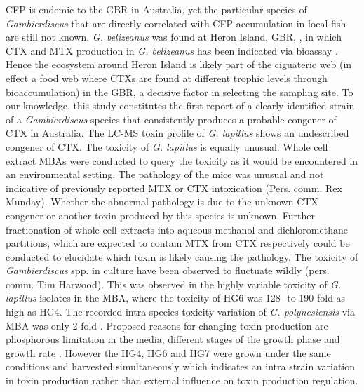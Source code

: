 \documentclass[12pt]{article}
\begin{document}
CFP is endemic to the GBR in Australia, yet the particular species of \textit{Gambierdiscus} that are directly correlated with CFP accumulation in local fish are still not known.
\emph{G. belizeanus} was found at Heron Island, GBR, \citep{murray2014molecular}, in which CTX and MTX production in \emph{G. belizeanus} has been indicated via bioassay \citep{chinain2010growth,holland2013differences}. 
Hence the ecosystem around Heron Island is likely part of the ciguateric web (in effect a food web where CTXs are found at different trophic levels through bioaccumulation) in the GBR, a decisive factor in selecting the sampling site.
To our knowledge, this study constitutes the first report of a clearly identified strain of a \textit{Gambierdiscus} species that consistently produces a probable congener of CTX in Australia. The LC-MS toxin profile of \emph{G. lapillus} shows an undescribed congener of CTX.
The toxicity of \emph{G. lapillus} is equally unusual. 
Whole cell extract MBAs were conducted to query the toxicity as it would be encountered in an environmental setting. The pathology of the mice was unusual and not indicative of previously reported MTX or CTX intoxication (Pers. comm. Rex Munday). 
Whether the abnormal pathology is due to the unknown CTX congener or another toxin produced by this species is unknown. 
Further fractionation of whole cell extracts into aqueous methanol and dichloromethane partitions, which are expected to contain MTX from CTX respectively \citep{satake1993structure} could be conducted to elucidate which toxin is likely causing the pathology.
The toxicity of \emph{Gambierdiscus} spp. in culture have been observed to fluctuate wildly (pers. comm. Tim Harwood). 
This was observed in the highly variable toxicity of \emph{G. lapillus} isolates in the MBA, where the toxicity of HG6 was 128- to 190-fold as high as HG4.  
The recorded intra species toxicity variation of \emph{G. polynesiensis} via MBA was only 2-fold \citep{chinain2010growth}. Proposed reasons for changing toxin production are phosphorous limitation in the media, different stages of the growth phase and growth rate \citep{sperr1996variation,chinain2010growth}. 
However the HG4, HG6 and HG7 were grown under the same conditions and harvested simultaneously which indicates an intra strain variation in toxin production rather than external influence on toxin production regulation.\\


\end{document}
